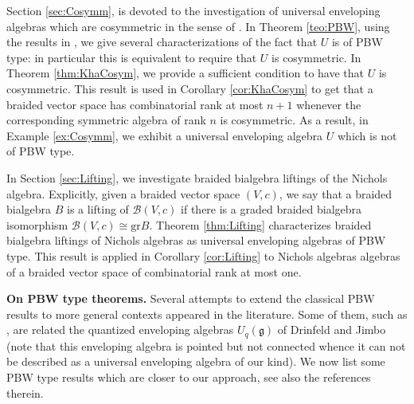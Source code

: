 \documentclass[english]{amsart}
\numberwithin{equation}{section}
\numberwithin{figure}{section}
\theoremstyle{plain}
\theoremstyle{definition}
\theoremstyle{definition}
\theoremstyle{remark}
\theoremstyle{remark}
\theoremstyle{plain}
\theoremstyle{plain}
\theoremstyle{plain}
\begin{document}
Section \ref{sec:Cosymm}, is devoted to the investigation of universal
enveloping algebras which are cosymmetric in the sense of \cite[Definition 3.1]{Kharchenko- connected}.
In Theorem \ref{teo:PBW}, using the results in \cite{Kharchenko- connected},
we give several characterizations of the fact that $U$ is of PBW type:
in particular this is equivalent to require that $U$ is cosymmetric.
In Theorem \ref{thm:KhaCosym}, we provide a sufficient condition
to have that $U$ is cosymmetric. This result is used in Corollary
\ref{cor:KhaCosym} to get that a braided vector space has combinatorial
rank at most $n+1$ whenever the corresponding symmetric algebra of
rank $n$ is cosymmetric. As a result, in Example \ref{ex:Cosymm},
we exhibit a universal enveloping algebra $U$ which is not of PBW
type.

In Section \ref{sec:Lifting}, we investigate braided bialgebra liftings
of the Nichols algebra. Explicitly, given a braided vector space $\left(V,c\right)$,
we say that a braided bialgebra $B$ is a lifting of\textbf{ $\mathcal{B}\left(V,c\right)$}
if there is a graded braided bialgebra isomorphism $\mathcal{B}\left(V,c\right)\cong\mathrm{gr}B$.
Theorem \ref{thm:Lifting} characterizes braided bialgebra liftings
of Nichols algebras as universal enveloping algebras of PBW type.
This result is applied in Corollary \ref{cor:Lifting} to Nichols
algebras algebras of a braided vector space of combinatorial rank
at most one. \medskip{}

\textbf{On PBW type theorems.} Several attempts to extend the classical PBW results to more general contexts appeared in the literature. Some of them, such as \cite{Yamane-APBWtheo, Rosso-AnAnaloguePBW, Lusztig-CanonicBasis, Ringel-PBW quantumGrps}, are related the quantized enveloping algebras $U_q(\mathfrak{g})$ of Drinfeld and Jimbo (note that this enveloping algebra is pointed but not connected whence it can not be described as a universal enveloping algebra of our kind). We now list some PBW type results which are closer to our approach, see also the references therein.
\end{document}
